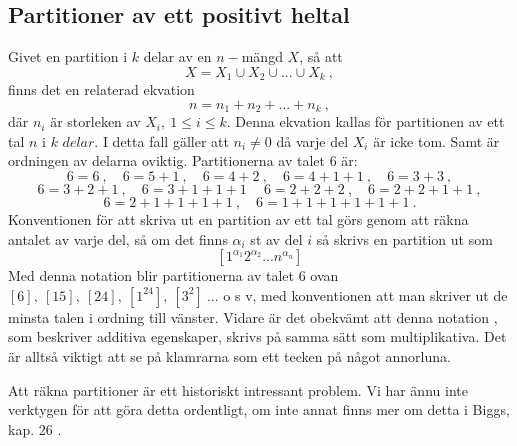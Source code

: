\documentclass{article}
\begin{document}
\subsection{Partitioner av ett positivt heltal}
Givet en partition i $k$ delar av en $n-$mängd $X$, så att
$$
X=X_1\cup X_2\cup...\cup X_k \ ,
$$
finns det en relaterad ekvation
$$
n=n_1+n_2+...+n_k \ ,
$$
där $n_i$ är storleken av $X_i, \ 1\leq i \leq k.$
Denna ekvation kallas för partitionen av ett tal $n$ i $k$ $delar.$ I detta fall gäller att $n_i\neq 0$ då varje del $X_i$ är icke tom. Samt är ordningen av delarna oviktig. Partitionerna av talet $6$ är:
$$
6=6 \ , \quad 6=5+1 \ , \quad 6=4+2 \ , \quad 6=4+1+1 \ , \quad 6=3+3 \ ,
$$
$$
6=3+2+1 \ , \quad 6=3+1+1+1 \ \quad 6=2+2+2 \ , \quad 6=2+2+1+1 \ ,
$$
$$
6=2+1+1+1+1 \ , \quad 6=1+1+1+1+1+1 \ .
$$
Konventionen för att skriva ut en partition av ett tal görs genom att räkna antalet av varje del, så om det finns $\alpha_i$ st av del $i$ så skrivs en partition ut som
$$
[1^{\alpha_1}2^{\alpha_2}...n^{\alpha_n}]
$$
Med denna notation blir partitionerna av talet $6$ ovan $[6], \ [15], \ [24], \ [1^24], \ [3^2] \ ...$ o s v, med konventionen att man skriver ut de minsta talen i ordning till vänster. Vidare är det obekvämt att denna notation , som beskriver additiva egenskaper, skrivs på samma sätt som multiplikativa. Det är alltså viktigt att se på klamrarna som ett tecken på något annorluna.

Att räkna partitioner är ett historiskt intressant problem. Vi har ännu inte verktygen för att göra detta ordentligt, om inte annat finns mer om detta i Biggs, kap. 26 .
\end{document}
